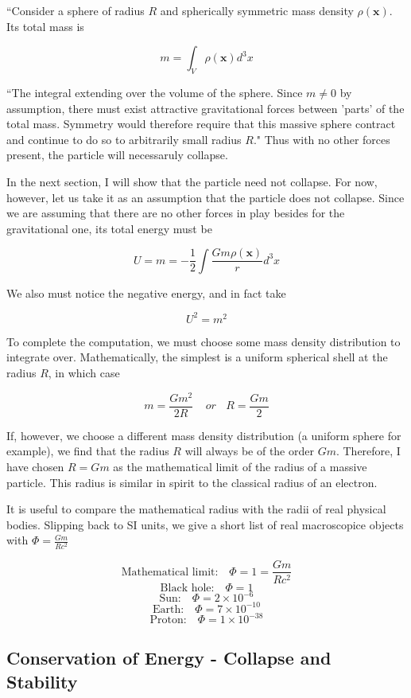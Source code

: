 \documentclass {article}
\renewcommand\vec{\mathbf}
\begin{document}
``Consider a sphere of radius $R$ and spherically symmetric mass density $\rho (\vec x)$. Its total mass is

$$ m = \int_V \rho(\vec x) d^3x$$

``The integral extending over the volume of the sphere. Since $m \neq 0$ by assumption, there must exist attractive gravitational forces between 'parts' of the total mass. Symmetry would therefore require that this massive sphere contract and continue to do so to arbitrarily small radius $R$." Thus with no other forces present, the particle will necessaruly collapse.

In the next section, I will show that the particle need not collapse. For now, however, let us take it as an assumption that the particle does not collapse. Since we are assuming that there are no other forces in play besides for the gravitational one, its total energy must be

$$U = m = - \frac 1 2 \int \frac {Gm \rho(\vec x)} {r} d^3x$$

We also must notice the negative energy, and in fact take 

$$U^2 = m^2$$

To complete the computation, we must choose some mass density distribution to integrate over. Mathematically, the simplest is a uniform spherical shell at the radius $R$, in which case

$$m = \frac {Gm^2} { 2R} ~~~~~ or  ~~~~ R = \frac {Gm} 2 $$

If, however, we choose a different mass density distribution (a uniform sphere for example), we find that the radius $R$ will always be of the order $Gm$. Therefore, I have chosen $R = Gm$ as the mathematical limit of the radius of a massive particle. This radius is similar in spirit to the classical radius of an electron.

It is useful to compare the mathematical radius with the radii of real physical bodies. Slipping back to SI units, we give a short list of real macroscopice objects with $\Phi = \frac {Gm}{Rc^2}$

$$\text{Mathematical limit:  } ~~~ \Phi = 1 = \frac {Gm}{Rc^2}$$
$$\text{Black hole:  } ~~~ \Phi = 1$$
$$\text{Sun:  } ~~~ \Phi = 2 \times 10^{-6}$$
$$\text{Earth:  } ~~~ \Phi = 7 \times 10^{-10}$$
$$\text{Proton:  } ~~~ \Phi = 1\times 10^{-38}$$


\newpage
\subsection{Conservation of Energy - Collapse and Stability}
\end{document}
